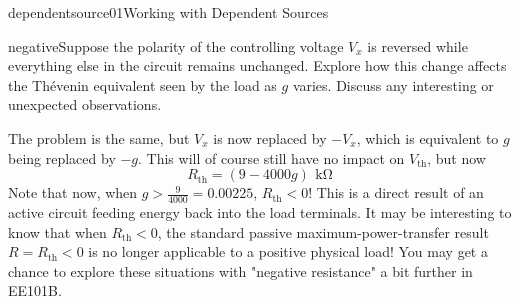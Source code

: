 \begin{mainquestion}{dependentsource01}{Working with Dependent Sources}
\begin{partquestion}{negative}{Suppose the polarity of the controlling voltage $V_x$ is reversed while everything else in the circuit remains unchanged. Explore how this change affects the Th\'evenin equivalent seen by the load as $g$ varies. Discuss any interesting or unexpected observations.}
\begin{answer}
The problem is the same, but $V_x$ is now replaced by $-V_x$, which is equivalent to $g$ being replaced by $-g$.  This will of course still have no impact on $V_{\mathrm{th}}$, but now 
\[
R_{\mathrm{th}}=(9-4000g)\,\qty{}{\kilo\ohm}
\]
Note that now, when $g>\frac{9}{4000}=0.00225$, $R_{\mathrm{th}} < 0$! This is a direct result of an active circuit feeding energy back into the load terminals.  It may be interesting to know that when $R_{\mathrm{th}} < 0$, the standard passive maximum-power-transfer result $R=R_{\mathrm{th}} < 0$ is no longer applicable to a positive physical load! You may get a chance to explore these situations with "negative resistance" a bit further in EE101B.
\end{answer}
\end{partquestion}
\end{mainquestion}